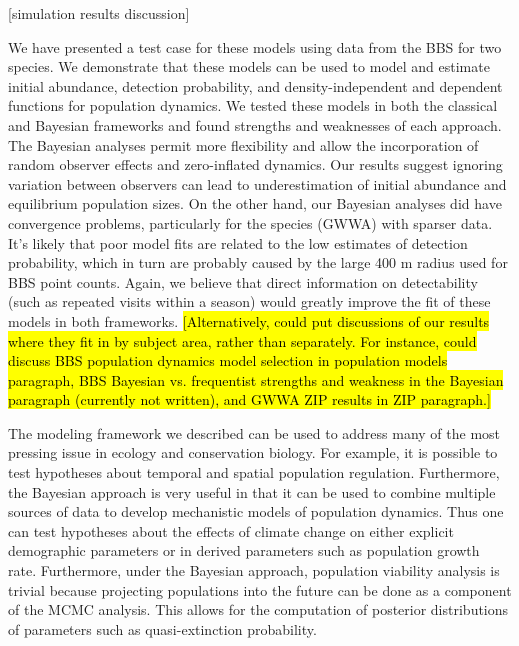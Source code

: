 \documentclass[12pt]{article}
\begin{document}
[simulation results discussion]

We have presented a test case for these models using data from
the BBS for two species. We demonstrate that these models can be
used to model and estimate initial abundance, detection
probability, and density-independent and dependent functions for
population dynamics. We tested these models in both the
classical and Bayesian frameworks and found strengths and
weaknesses of each approach. The Bayesian analyses permit more
flexibility and allow the incorporation of random observer
effects and zero-inflated dynamics. Our results suggest ignoring
variation between observers can lead to underestimation of
initial abundance and equilibrium population sizes. On the other
hand, our Bayesian analyses did have convergence problems,
particularly for the species (GWWA) with sparser data. It's
likely that poor model fits are related to the low estimates of
detection probability, which in turn are probably caused by the
large 400 m radius used for BBS point counts. Again, we believe
that direct information on detectability (such as repeated
visits within a season) would greatly improve the fit of these
models in both frameworks.
\hl{[Alternatively, could put discussions of our results where
they fit in by subject area, rather than separately. For
instance, could discuss BBS population dynamics model selection
in population models paragraph, BBS Bayesian vs.
frequentist strengths and weakness in the Bayesian paragraph
(currently not written), and GWWA ZIP results in ZIP paragraph.]}

The modeling framework we described can be used to address many of the
most pressing issue in ecology and conservation biology. For example,
it is possible to test hypotheses about temporal and spatial
population regulation. Furthermore, the Bayesian approach is very
useful in that it can be used to combine multiple sources of data to
develop mechanistic models of population dynamics. Thus one can test
hypotheses about the effects of climate change on either explicit
demographic parameters or in derived parameters such as population
growth rate. Furthermore, under the Bayesian approach, population
viability analysis is trivial because projecting populations into the
future can be done as a component of the MCMC analysis. This allows
for the computation of posterior distributions of parameters such as
quasi-extinction probability.





\newpage
\end{document}
